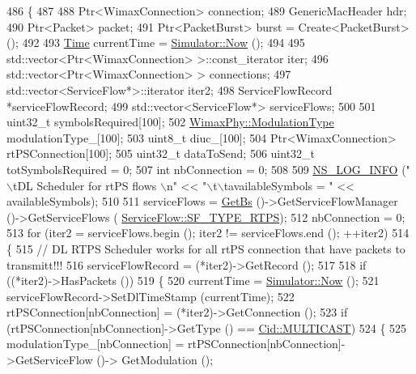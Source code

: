\begin{DoxyCode}
486 \{
487 
488   Ptr<WimaxConnection> connection;
489   GenericMacHeader hdr;
490   Ptr<Packet> packet;
491   Ptr<PacketBurst> burst = Create<PacketBurst> ();
492 
493   \hyperlink{namespacens3_1_1TracedValueCallback_a7ffd3e7c142ffe7c8a1d2db9b8de38ec}{Time} currentTime = \hyperlink{classns3_1_1Simulator_ac3178fa975b419f7875e7105be122800}{Simulator::Now} ();
494 
495   std::vector<Ptr<WimaxConnection> >::const\_iterator iter;
496   std::vector<Ptr<WimaxConnection> > connections;
497   std::vector<ServiceFlow*>::iterator iter2;
498   ServiceFlowRecord *serviceFlowRecord;
499   std::vector<ServiceFlow*> serviceFlows;
500 
501   uint32\_t symbolsRequired[100];
502   \hyperlink{classns3_1_1WimaxPhy_a044c5d8a48ca992c39c2a946f6e755fa}{WimaxPhy::ModulationType} modulationType\_[100];
503   uint8\_t diuc\_[100];
504   Ptr<WimaxConnection> rtPSConnection[100];
505   uint32\_t dataToSend;
506   uint32\_t totSymbolsRequired = 0;
507   \textcolor{keywordtype}{int} nbConnection = 0;
508 
509   \hyperlink{group__logging_gafbd73ee2cf9f26b319f49086d8e860fb}{NS\_LOG\_INFO} (\textcolor{stringliteral}{"\(\backslash\)tDL Scheduler for rtPS flows \(\backslash\)n"} << \textcolor{stringliteral}{"\(\backslash\)t\(\backslash\)tavailableSymbols = "} << 
      availableSymbols);
510 
511   serviceFlows = \hyperlink{classns3_1_1BSScheduler_a8b09065ac8f74cb35446af55128e41c7}{GetBs} ()->GetServiceFlowManager ()->GetServiceFlows (
      \hyperlink{classns3_1_1ServiceFlow_a7990ba10be1e098328fd1e6382a26235a0e98ff713b932a029acad7e5b24bbf55}{ServiceFlow::SF\_TYPE\_RTPS});
512   nbConnection = 0;
513   \textcolor{keywordflow}{for} (iter2 = serviceFlows.begin (); iter2 != serviceFlows.end (); ++iter2)
514     \{
515       \textcolor{comment}{// DL RTPS Scheduler works for all rtPS connection that have packets to transmitt!!!}
516       serviceFlowRecord = (*iter2)->GetRecord ();
517 
518       \textcolor{keywordflow}{if} ((*iter2)->HasPackets ())
519         \{
520           currentTime = \hyperlink{classns3_1_1Simulator_ac3178fa975b419f7875e7105be122800}{Simulator::Now} ();
521           serviceFlowRecord->SetDlTimeStamp (currentTime);
522           rtPSConnection[nbConnection] = (*iter2)->GetConnection ();
523           \textcolor{keywordflow}{if} (rtPSConnection[nbConnection]->GetType () == \hyperlink{classns3_1_1Cid_a10b8f92080ca5790e65a0bfa2f557e0aa4d3bf31623ed09b9755d86bdfa345a4a}{Cid::MULTICAST})
524             \{
525               modulationType\_[nbConnection] = rtPSConnection[nbConnection]->GetServiceFlow ()->
      GetModulation ();

\end{DoxyCode}
